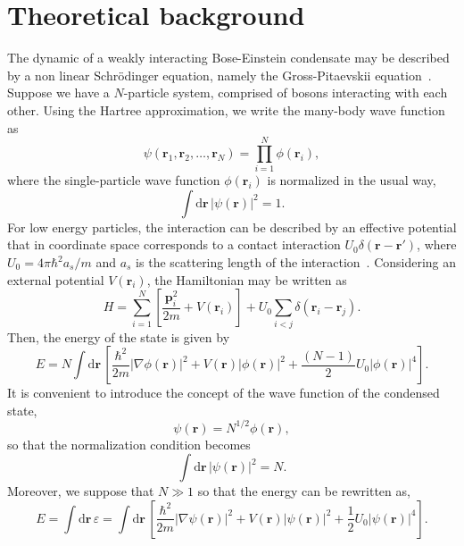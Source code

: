 \section{Theoretical background}
The dynamic of a weakly interacting Bose-Einstein condensate may be described by a non linear Schr\"odinger equation, namely the Gross-Pitaevskii equation~\citep{RC97,JKP98,DCLZ98,ZPMW99,DGPS99}.
 Suppose we have a $N$-particle system, comprised of bosons interacting with each other. Using the Hartree approximation, we write the many-body wave function as
\begin{equation}
\psi(\textbf{r}_1, \textbf{r}_2,\ldots, \textbf{r}_N) = \prod_{i=1}^N \phi(\textbf{r}_i),
\end{equation}
where the single-particle wave function $\phi(\textbf{r}_i)$ is normalized in the usual way,
\begin{equation}
\int \mathrm{d}\textbf{r} \, |\psi(\textbf{r})|^2 = 1.
\end{equation} 
For low energy particles, the interaction can be described by an effective potential %
that in coordinate space corresponds to a contact interaction $U_0 \delta(\textbf{r} - \textbf{r}')$, where $U_0 = 4 \pi \hbar^2 a_s / m$ and $a_s$ is the scattering length of the interaction~\citep{pethick2002bose}. Considering an external potential $V(\textbf{r}_i)$, the Hamiltonian may be written as
\begin{equation}
H = \sum_{i=1}^N \left[ \frac{\textbf{p}_i^2}{2 m} + V(\textbf{r}_i) \right] + U_0 \sum_{i<j} \delta(\textbf{r}_i - \textbf{r}_j).
\end{equation}
Then, the energy of the state is given by
\begin{equation}
E =  N \int \mathrm{d} \textbf{r} \, \left[ \frac{\hbar^2}{2m} |\nabla \phi(\textbf{r}) |^2 + V(\textbf{r}) |\phi(\textbf{r})|^2 + \frac{(N-1)}{2} U_0 |\phi(\textbf{r})|^4 \right].
\end{equation} 
It is convenient to introduce the concept of the wave function of the condensed state,
\begin{equation}
\psi(\textbf{r}) = N^{1/2} \phi(\textbf{r}),
\end{equation}
so that the normalization condition becomes
\begin{equation} \label{eq:normalization-N}
\int \mathrm{d}\textbf{r} \, |\psi(\textbf{r})|^2 = N.
\end{equation}
Moreover, we suppose that $N \gg 1$ so that the energy can be rewritten as,
\begin{equation}
E = \int \mathrm{d} \textbf{r} \, \varepsilon  = \int \mathrm{d} \textbf{r} \, \left[ \frac{\hbar^2}{2m} |\nabla \psi(\textbf{r}) |^2 + V(\textbf{r}) |\psi(\textbf{r})|^2 + \frac{1}{2} U_0 |\psi(\textbf{r})|^4 \right].
\end{equation}
